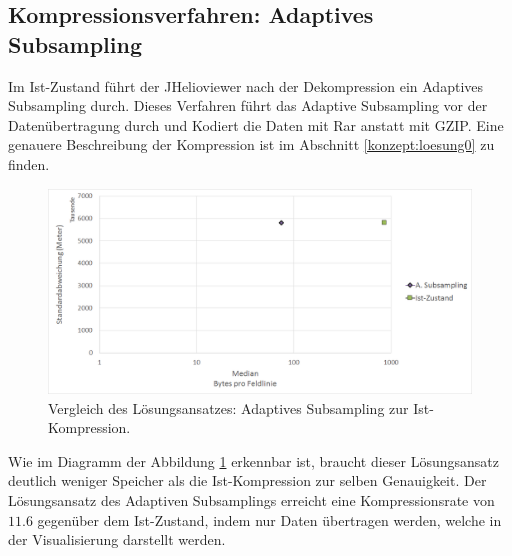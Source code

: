 \subsection{Kompressionsverfahren: Adaptives Subsampling} \label{resultate:loesung0}
Im Ist-Zustand führt der JHelioviewer nach der Dekompression ein Adaptives Subsampling durch. Dieses Verfahren führt das Adaptive Subsampling vor der Datenübertragung durch und Kodiert die Daten mit Rar anstatt mit GZIP. Eine genauere Beschreibung der Kompression ist im Abschnitt \ref{konzept:loesung0} zu finden.

\begin{figure}[!htbp]
	\center
	\includegraphics[width=1\textwidth,keepaspectratio]{./pictures/resultate/loesung0/loesung0_0.png}
	\caption{Vergleich des Lösungsansatzes: Adaptives Subsampling zur Ist-Kompression.}
	\label{resultate:loesung0:loesung0_0}
\end{figure}
Wie im Diagramm der Abbildung \ref{resultate:loesung0:loesung0_0} erkennbar ist, braucht dieser Lösungsansatz deutlich weniger Speicher als die Ist-Kompression zur selben Genauigkeit. Der Lösungsansatz des Adaptiven Subsamplings erreicht eine Kompressionsrate von $11.6$ gegenüber dem Ist-Zustand, indem nur Daten übertragen werden, welche in der Visualisierung darstellt werden.


